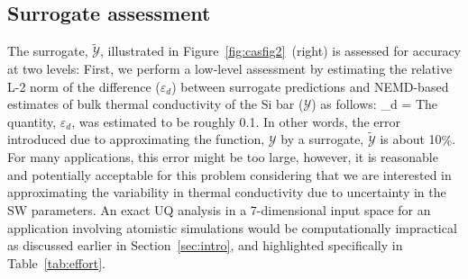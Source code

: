 \subsection{Surrogate assessment}
\label{sub:ver}

The surrogate, $\tilde{\mathcal{Y}}$, illustrated in Figure~\ref{fig:casfig2}~(right) 
is assessed for accuracy at two levels: First, we perform a low-level assessment by estimating
 the relative L-2 norm of the difference
($\varepsilon_d$) between surrogate predictions and NEMD-based estimates of bulk thermal conductivity 
of the Si bar ($\mathcal{Y}$) as follows:
%
\be
\varepsilon_d = 
\ee
%
The quantity, $\varepsilon_d$, was estimated to be roughly 0.1. In other words, the error introduced
due to approximating the function, $\mathcal{Y}$ by a surrogate, $\tilde{\mathcal{Y}}$ is about 10$\%$.
For many applications, this error might be too large, however, it is reasonable and
potentially acceptable for this problem considering that we are interested in approximating
the variability in thermal conductivity due to uncertainty in the SW
parameters. An exact UQ analysis in a 7-dimensional input space for an application involving
atomistic simulations would be computationally impractical as discussed earlier in
Section~\ref{sec:intro}, and highlighted specifically in Table~\ref{tab:effort}.

